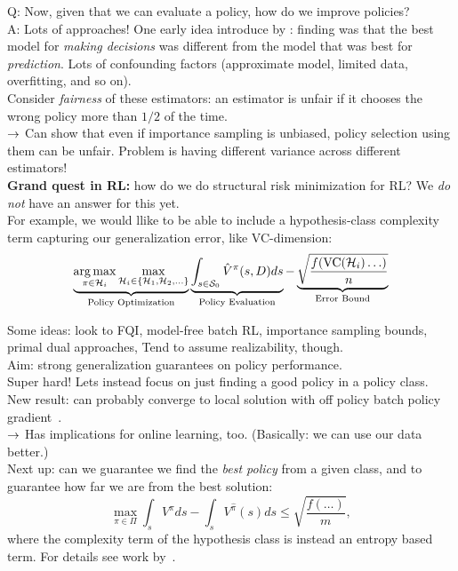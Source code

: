 Q: Now, given that we can evaluate a policy, how do we improve policies? \\

A: Lots of approaches! One early idea introduce by \citet{mandel2014offline}: finding was that the best model for {\it making decisions} was different from the model that was best for {\it prediction}. Lots of confounding factors (approximate model, limited data, overfitting, and so on). \\

Consider {\it fairness} of these estimators: an estimator is unfair if it chooses the wrong policy more than $1/2$ of the time. \\

$\rightarrow$ Can show that even if importance sampling is unbiased, policy selection using them can be unfair. Problem is having different variance across different estimators! \\

{\bf Grand quest in RL:} how do we do structural risk minimization for RL? We {\it do not} have an answer for this yet. \\

For example, we would llike to be able to include a hypothesis-class complexity term capturing our generalization error, like VC-dimension:
\[
\underbrace{\operatorname*{arg\,max}_{\pi \in \mathcal{H}_i} \max_{\mathcal{H}_i \in \{\mathcal{H}_1, \mathcal{H}_2, \ldots\}}}_{\text{Policy Optimization}} \underbrace{\int_{s \in \mathcal{S}_0} \hat{V}^{\pi}(s, D) ds}_{\text{Policy Evaluation}} - \underbrace{\sqrt{\frac{f(\text{VC}(\mathcal{H}_i) \ldots)}{n}}}_{\text{Error Bound}}
\]

Some ideas: look to FQI, model-free batch RL, importance sampling bounds, primal dual approaches, Tend to assume realizability, though. \\

Aim: strong generalization guarantees on policy performance.  \\

Super hard! Lets instead focus on just finding a good policy in a policy class. \\

New result: can probably converge to local solution with off policy batch policy gradient~\cite{liu2019off}. \\

$\rightarrow$ Has implications for online learning, too. (Basically: we can use our data better.) \\

Next up: can we guarantee we find the {\it best policy} from a given class, and to guarantee how far we are from the best solution:
\[
\max_{\pi \in \Pi} \int_s V^\pi ds - \int_s V^{\hat{\pi}}(s) ds \leq \sqrt{\frac{f(\ldots)}{m}},
\]
where the complexity term of the hypothesis class is instead an entropy based term. For details see work by~\citet{nie2019learning}. \\

